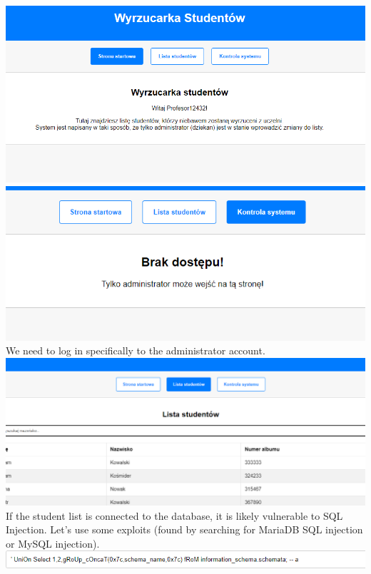 \documentclass{article}
\begin{document}
\includegraphics[width=\textwidth]{"image22.png"}
\includegraphics[width=\textwidth]{"image23.png"}
We need to log in specifically to the administrator account. \\
\includegraphics[width=\textwidth]{"image24.png"}
\vspace{3mm} \\
If the student list is connected to the database, it is likely vulnerable to SQL Injection. Let’s use some exploits (found by searching for MariaDB SQL injection or MySQL injection).
\vspace{3mm} \\
\includegraphics[width=\textwidth]{"image25.png"}
\vspace{3mm}
\end{document}
